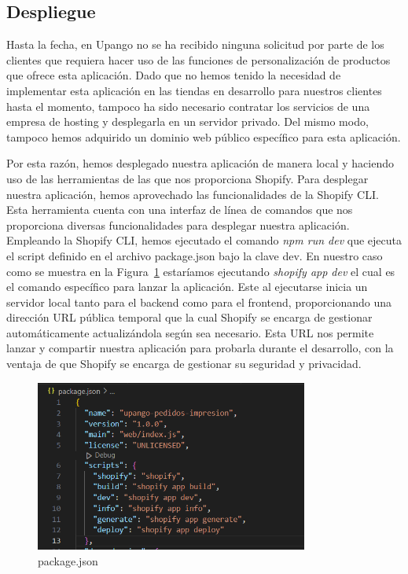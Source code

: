 \documentclass[12pt]{article}
\begin{document}
\subsection{Despliegue}
Hasta la fecha, en Upango no se ha recibido ninguna solicitud por parte de los clientes que requiera hacer uso de las funciones de personalización de productos
que ofrece esta aplicación. Dado que no hemos tenido la necesidad de implementar esta aplicación en las tiendas en desarrollo para nuestros clientes hasta el momento, tampoco ha sido 
necesario contratar los servicios de una empresa de hosting y desplegarla en un servidor privado. Del mismo modo, tampoco hemos adquirido un dominio web público 
específico para esta aplicación.

Por esta razón, hemos desplegado nuestra aplicación de manera local y haciendo uso de las herramientas de las que nos proporciona Shopify. Para desplegar nuestra aplicación,
hemos aprovechado las funcionalidades de la Shopify CLI. Esta herramienta cuenta con una interfaz de línea de comandos que nos proporciona diversas funcionalidades para desplegar nuestra aplicación.
Empleando la Shopify CLI, hemos ejecutado el comando \textit{npm run dev} que ejecuta el script definido en el archivo package.json bajo la clave dev. En nuestro caso como se muestra en la Figura~\ref{fig:scriptsPackageJson} estaríamos ejecutando \textit{shopify app dev} el cual es el comando específico para lanzar la aplicación.
Este al ejecutarse inicia un servidor local tanto para el backend como para el frontend, proporcionando
una dirección URL pública temporal que la cual Shopify se encarga de gestionar automáticamente actualizándola según sea necesario. Esta URL nos permite lanzar y compartir nuestra aplicación para probarla durante el desarrollo, con la ventaja de que 
Shopify se encarga de gestionar su seguridad y privacidad.

\begin{figure}[ht]
    \centering
    \includegraphics[width=0.8\textwidth]{imagenes/package.json.scripts.png}
    \caption{\label{fig:scriptsPackageJson}package.json}
    \vspace{\fill}
\end{figure}
\end{document}
